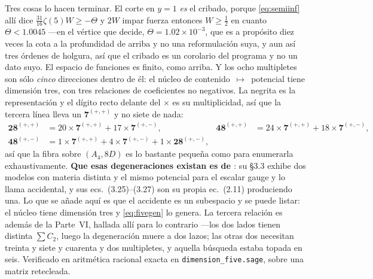 \documentclass[11pt,a4paper]{article}
\newcommand{\rep}[1]{\mathbf{#1}}
\begin{document}
Tres cosas lo hacen terminar. El corte en $y=1$ \emph{es} el cribado, porque \eqref{eq:semiinf} allí
dice $\tfrac{31}{16}\zeta(5)W\ge-\Theta$ y $2W$ impar fuerza entonces $W\ge\tfrac12$ en cuanto
$\Theta<1.0045$ ---en el vértice que decide, $\Theta=1.02\times10^{-3}$, que es a propósito diez
veces la cota a la profundidad de arriba y no una reformulación suya, y aun así tres órdenes de
holgura, así que el cribado es un corolario del programa y no un dato suyo. El espacio de funciones es finito,
como arriba. Y los ocho multipletes son sólo \emph{cinco} direcciones dentro de él: el núcleo de
contenido~$\mapsto$~potencial tiene dimensión tres, con tres relaciones de coeficientes no negativos.
La negrita es la representación y el dígito recto delante del $\times$ es su multiplicidad, así que
la tercera línea lleva un $\rep7^{(+,+)}$ y no siete de nada:
\begin{equation}\label{eq:fivegen}
\begin{aligned}
  \rep{28}^{(+,+)}&=20\times\rep7^{(+,+)}+17\times\rep7^{(+,-)}, &
  \rep{48}^{(+,+)}&=24\times\rep7^{(+,+)}+18\times\rep7^{(+,-)},\\
  \rep{48}^{(+,-)}&=1\times\rep7^{(+,+)}+4\times\rep7^{(+,-)}+1\times\rep{28}^{(+,-)}, & &
\end{aligned}
\end{equation}
así que la fibra sobre $(A_4,8D)$ es lo bastante pequeña como para enumerarla exhaustivamente.
\textbf{Que esas degeneraciones existan es de \cite{CCD24}}: su \S3.3 exhibe dos modelos con
materia distinta y el mismo potencial para el escalar gauge y lo llama accidental, y sus
ecs.~(3.25)--(3.27) son su propia ec.~(2.11) produciendo una. Lo que se añade aquí es que el
accidente es un subespacio y se puede listar: el núcleo tiene dimensión tres y
\eqref{eq:fivegen} lo genera. La tercera relación es además de la Parte~VI, hallada allí para lo
contrario ---los dos lados tienen distinta $\sum C_2$, luego la degeneración muere a dos lazos; las
otras dos necesitan treinta y siete y cuarenta y dos multipletes, y aquella búsqueda estaba topada
en seis. Verificado en aritmética racional exacta en \texttt{dimension\_\allowbreak five.sage},
sobre una matriz retecleada.
\end{document}
